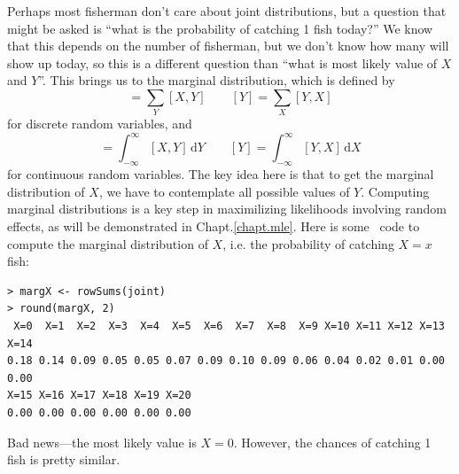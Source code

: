 Perhaps most fisherman don't care about joint distributions, but a
question that might be asked is ``what is the probability
of catching 1 fish today?'' We know that this depends on the
number of fisherman, but we don't know how many will show up
today, so this is a different question than ``what is most likely
value of $X$ and $Y$''. This brings us to the marginal distribution, which is defined by
\begin{equation*}
  [X] = \sum_Y [X,Y] \qquad
  [Y] = \sum_X [Y,X]
\end{equation*}
for discrete random variables, and
\begin{equation*}
  [X] = \int_{-\infty}^\infty [X,Y] \, \mathrm{d}Y \qquad
  [Y] = \int_{-\infty}^\infty [Y,X] \, \mathrm{d}X
\end{equation*}
for continuous random variables. The key idea here is that to get the
marginal distribution of $X$, we have to contemplate all possible
values of $Y$. Computing marginal distributions is a key step in
maximilizing likelihoods involving random effects, as will be
demonstrated in Chapt.\ref{chapt.mle}. Here is some \R~code to compute
the marginal distribution of $X$, i.e. the probability of catching
$X=x$ fish:
\begin{verbatim}
> margX <- rowSums(joint)
> round(margX, 2)
 X=0  X=1  X=2  X=3  X=4  X=5  X=6  X=7  X=8  X=9 X=10 X=11 X=12 X=13 X=14
0.18 0.14 0.09 0.05 0.05 0.07 0.09 0.10 0.09 0.06 0.04 0.02 0.01 0.00 0.00
X=15 X=16 X=17 X=18 X=19 X=20
0.00 0.00 0.00 0.00 0.00 0.00
\end{verbatim}
Bad news---the most likely value is $X=0$. However, the chances of
catching 1 fish is pretty similar.

